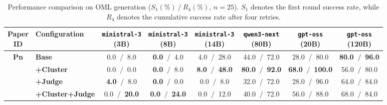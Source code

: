 \begin{table}[htbp]
    \centering
    \small
    \setlength{\tabcolsep}{4pt}
    \caption{Performance comparison on OML generation ($S_1(\%)~/~R_4(\%)$, $n=25$). $S_1$ denotes the first round success rate, while $R_4$ denotes the cumulative success rate after four retries.}
    \begin{tabular}{c|l|cccccc}
        \hline
        \makecell{\textbf{Paper} \\ \textbf{ID}} & \textbf{Configuration} & \makecell{\texttt{ministral-3} \\ (3B)} & \makecell{\texttt{ministral-3} \\ (8B)} & \makecell{\texttt{ministral-3} \\ (14B)} & \makecell{\texttt{qwen3-next} \\ (80B)} & \makecell{\texttt{gpt-oss} \\ (20B)} & \makecell{\texttt{gpt-oss} \\ (120B)} \\
        \hline
        
        \multirow{4}{*}{\textbf{Pn}} 
          & \textbf{Base}& 0.0 $~/~$ 8.0 & \textbf{0.0} $~/~$ 4.0 & 4.0 $~/~$ 28.0 & 44.0 $~/~$ 72.0 & 28.0 $~/~$ 80.0 & \textbf{80.0} $~/~$ \textbf{96.0} \\
          & \textbf{+Cluster}& 0.0 $~/~$ 0.0 & \textbf{0.0} $~/~$ 8.0 & \textbf{8.0} $~/~$ \textbf{48.0} & \textbf{80.0} $~/~$ \textbf{92.0} & \textbf{68.0} $~/~$ \textbf{100.0} & 56.0 $~/~$ 80.0 \\
          & \textbf{+Judge}& \textbf{4.0} $~/~$ 8.0 & \textbf{0.0} $~/~$ 0.0 & 0.0 $~/~$ 8.0 & 32.0 $~/~$ 72.0 & 28.0 $~/~$ 96.0 & 64.0 $~/~$ 84.0 \\
          & \textbf{+Cluster+Judge}& 0.0 $~/~$ \textbf{20.0} & \textbf{0.0} $~/~$ \textbf{24.0} & 0.0 $~/~$ 12.0 & 40.0 $~/~$ 72.0 & 56.0 $~/~$ 88.0 & 68.0 $~/~$ 84.0 \\
        \hline
        
    \end{tabular}
    \label{tab:success_rates_pn}
\end{table}